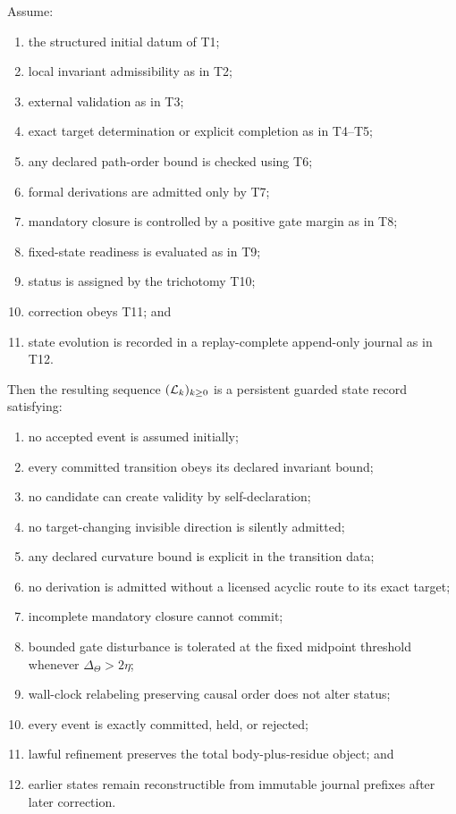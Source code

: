 \begin{theorem}
Assume:
\begin{enumerate}[label=(\roman*)]
\item the structured initial datum of T1;
\item local invariant admissibility as in T2;
\item external validation as in T3;
\item exact target determination or explicit completion as in T4--T5;
\item any declared path-order bound is checked using T6;
\item formal derivations are admitted only by T7;
\item mandatory closure is controlled by a positive gate margin as in T8;
\item fixed-state readiness is evaluated as in T9;
\item status is assigned by the trichotomy T10;
\item correction obeys T11; and
\item state evolution is recorded in a replay-complete append-only journal as in T12.
\end{enumerate}
Then the resulting sequence $(\mathcal L_k)_{k\ge0}$ is a persistent guarded state record satisfying:
\begin{enumerate}[label=(\alph*)]
\item no accepted event is assumed initially;
\item every committed transition obeys its declared invariant bound;
\item no candidate can create validity by self-declaration;
\item no target-changing invisible direction is silently admitted;
\item any declared curvature bound is explicit in the transition data;
\item no derivation is admitted without a licensed acyclic route to its exact target;
\item incomplete mandatory closure cannot commit;
\item bounded gate disturbance is tolerated at the fixed midpoint threshold whenever $\Delta_\Theta>2\eta$;
\item wall-clock relabeling preserving causal order does not alter status;
\item every event is exactly committed, held, or rejected;
\item lawful refinement preserves the total body-plus-residue object; and
\item earlier states remain reconstructible from immutable journal prefixes after later correction.
\end{enumerate}
\end{theorem}

